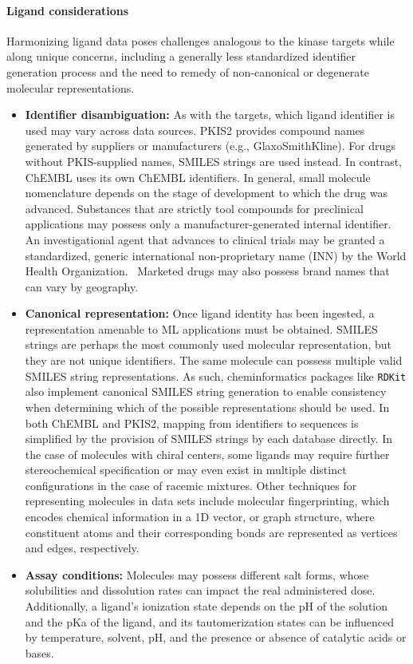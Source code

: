 \documentclass[9pt,lessons]{livecoms}
\begin{document}
\paragraph{Ligand considerations}
Harmonizing ligand data poses challenges analogous to the kinase targets while along unique concerns, including a generally less standardized identifier generation process and the need to remedy of non-canonical or degenerate molecular representations.
\begin{itemize}
\item {\bf Identifier disambiguation:} As with the targets, which ligand identifier is used may vary across data sources. PKIS2 provides compound names generated by suppliers or manufacturers (e.g., GlaxoSmithKline). For drugs without PKIS-supplied names, SMILES strings are used instead. In contrast, ChEMBL uses its own ChEMBL identifiers. In general, small molecule nomenclature depends on the stage of development to which the drug was advanced. Substances that are strictly tool compounds for preclinical applications may possess only a manufacturer-generated internal identifier. An investigational agent that advances to clinical trials may be granted a standardized, generic international non-proprietary name (INN) by the World Health Organization.~\cite{debruyne2018inn} Marketed drugs may also possess brand names that can vary by geography.
\item {\bf Canonical representation:} Once ligand identity has been ingested, a representation amen\-able to ML applications must be obtained. SMILES strings are perhaps the most commonly used molecular representation, but they are not unique identifiers. The same molecule can possess multiple valid SMILES string representations. As such, cheminformatics packages like \texttt{RDKit} also implement canonical SMILES string generation to enable consistency when determining which of the possible representations should be used. In both ChEMBL and PKIS2, mapping from identifiers to sequences is simplified by the provision of SMILES strings by each database directly. In the case of molecules with chiral centers, some ligands may require further stereochemical specification or may even exist in multiple distinct configurations in the case of racemic mixtures. Other techniques for representing molecules in data sets include molecular fingerprinting, which encodes chemical information in a 1D vector, or graph structure, where constituent atoms and their corresponding bonds are represented as vertices and edges, respectively.~\cite{david2020cheminform}
\item {\bf Assay conditions:} Molecules may possess different salt forms, whose solubilities and dissolution rates can impact the real administered dose. Additionally, a ligand's ionization state depends on the pH of the solution and the pKa of the ligand, and its tautomerization states can be influenced by temperature, solvent, pH, and the presence or absence of catalytic acids or bases.~\cite{lu2021ionization}
\end{itemize}
\end{document}
